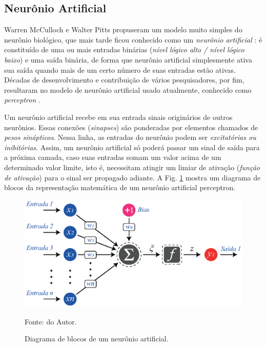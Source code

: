 \subsection{Neurônio Artificial}

Warren McCulloch e Walter Pitts propuseram um modelo muito simples do neurônio biológico, que mais tarde ficou conhecido como um \textit{neurônio artificial} \cite{mcculloch1943logical}: é constituído de uma ou mais entradas binárias (\textit{nível lógico alto / nível lógico baixo}) e uma saída binária, de forma que neurônio artificial simplesmente ativa sua saída quando mais de um certo número de suas entradas estão ativas. Décadas de desenvolvimento e contribuição de vários pesquisadores, por fim, resultaram no modelo de neurônio artificial usado atualmente, conhecido como \textit{perceptron} \cite{aggarwal2018neural,haykin2007redes}.

Um neurônio artificial recebe em sua entrada sinais originários de outros neurônios. Essas conexões (\textit{sinapses}) são ponderadas por elementos chamados de \textit{pesos sinápticos}. Nessa linha, as entradas do neurônio podem ser \textit{excitatórias ou \textit{inibitórias}}. Assim, um neurônio artificial só poderá passar um sinal de saída para a próxima camada, caso suas entradas somam um valor acima de um determinado valor limite, isto é, necessitam atingir um limiar de ativação (\textit{função de ativação}) para o sinal ser propagado adiante. A Fig. \ref{fig: ArtificialNeuronModel} mostra um diagrama de blocos da representação matemática de um neurônio artificial perceptron.

\begin{figure}[H]
    \centering
    \includegraphics{04-Figuras/ArtificialNeuronModel.eps}
    \caption{Diagrama de blocos de um neurônio artificial.} \par
    Fonte: do Autor.
    \label{fig: ArtificialNeuronModel}
\end{figure}

